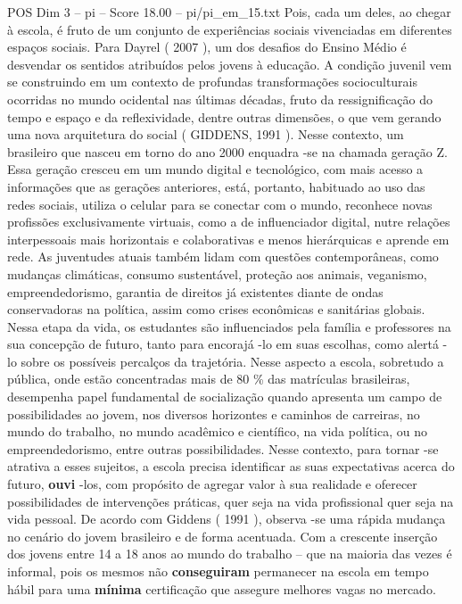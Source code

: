 \begin{textsample}{POS Dim 3 – pi – Score 18.00 – pi/pi\_em\_15.txt}
Pois, cada um deles, ao chegar à escola, é fruto de um conjunto de experiências sociais vivenciadas em diferentes espaços sociais.
Para Dayrel ( 2007 ), um dos desafios do Ensino Médio é desvendar os sentidos atribuídos pelos jovens à educação.
A condição juvenil vem se construindo em um contexto de profundas transformações socioculturais ocorridas no mundo ocidental nas últimas décadas, fruto da ressignificação do tempo e espaço e da reflexividade, dentre outras dimensões, o que vem gerando uma nova arquitetura do social ( GIDDENS, 1991 ).
Nesse contexto, um brasileiro que nasceu em torno do ano 2000 enquadra -se na chamada geração Z.
Essa geração cresceu em um mundo digital e tecnológico, com mais acesso a informações que as gerações anteriores, está, portanto, habituado ao uso das redes sociais, utiliza o celular para se conectar com o mundo, reconhece novas profissões exclusivamente virtuais, como a de influenciador digital, nutre relações interpessoais mais horizontais e colaborativas e menos hierárquicas e aprende em rede.
As juventudes atuais também lidam com questões contemporâneas, como mudanças climáticas, consumo sustentável, proteção aos animais, veganismo, empreendedorismo, garantia de direitos já existentes diante de ondas conservadoras na política, assim como crises econômicas e sanitárias globais.
Nessa etapa da vida, os estudantes são influenciados pela família e professores na sua concepção de futuro, tanto para encorajá -lo em suas escolhas, como alertá -lo sobre os possíveis percalços da trajetória.
Nesse aspecto a escola, sobretudo a pública, onde estão concentradas mais de 80 \% das matrículas brasileiras, desempenha papel fundamental de socialização quando apresenta um campo de possibilidades ao jovem, nos diversos horizontes e caminhos de carreiras, no mundo do trabalho, no mundo acadêmico e científico, na vida política, ou no empreendedorismo, entre outras possibilidades.
Nesse contexto, para tornar -se atrativa a esses sujeitos, a escola precisa identificar as suas expectativas acerca do futuro, \textbf{ouvi} -los, com propósito de agregar valor à sua realidade e oferecer possibilidades de intervenções práticas, quer seja na vida profissional quer seja na vida pessoal.
De acordo com Giddens ( 1991 ), observa -se uma rápida mudança no cenário do jovem brasileiro e de forma acentuada.
Com a crescente inserção dos jovens entre 14 a 18 anos ao mundo do trabalho – que na maioria das vezes é informal, pois os mesmos não \textbf{conseguiram} permanecer na escola em tempo hábil para uma \textbf{mínima} certificação que assegure melhores vagas no mercado.

\end{textsample}
